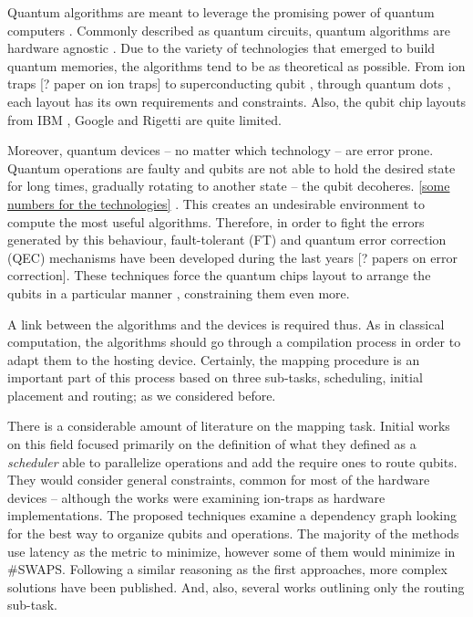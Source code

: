 \documentclass[11pt]{article}
\author{Daniel Moreno Manzano}
\date{\today}
\title{}
\begin{document}
Quantum algorithms are meant to leverage the promising power of quantum computers \cite{coles18:quant_algor_implem_begin}.
Commonly described as quantum circuits, quantum algorithms are hardware agnostic \cite{Nielsen_2009}.
Due to the variety of technologies that emerged to build quantum memories, the algorithms tend to be as theoretical as possible.
From ion traps [? paper on ion traps] to superconducting qubit \cite{Barends_2014}, through quantum dots \cite{Hill_2015,Li_2018}, each layout has its own requirements and constraints.
Also, the qubit chip layouts from IBM \cite{IBM_QX}, Google \cite{boixo16:charac_quant_suprem_near_term_devic} and Rigetti \cite{Sete_2016} are quite limited.

Moreover, quantum devices -- no matter which technology -- are error prone.
Quantum operations are faulty and qubits are not able to hold the desired state for long times, gradually rotating to another state -- the qubit decoheres.
\uline{[some numbers for the technologies]} \cite{O_Brien_2017}.
This creates an undesirable environment to compute the most useful algorithms.
Therefore, in order to fight the errors generated by this behaviour, fault-tolerant (FT) and quantum error correction (QEC) mechanisms have been developed during the last years \cite{Nielsen_2009} [? papers on error correction].
These techniques force the quantum chips layout to arrange the qubits in a particular manner \cite{Versluis_2017}, constraining them even more.

A link between the algorithms and the devices is required \cite{Fu_2016} thus.
As in classical computation, the algorithms should go through a compilation process in order to adapt them to the hosting device.
Certainly, the mapping procedure is an important part of this process based on three sub-tasks, scheduling, initial placement and routing; as we considered before.

There is a considerable amount of literature on the mapping task.
Initial works on this field \cite{Metodi_2006,Whitney_2007,Bahreini_2015} focused primarily on the definition of what they defined as a \emph{scheduler} able to parallelize operations and add the require ones to route qubits.
They would consider general constraints, common for most of the hardware devices -- although the works were examining ion-traps as hardware implementations.
The proposed techniques examine a dependency graph looking for the best way to organize qubits and operations.
The majority of the methods use latency as the metric to minimize, however some of them \cite{Farghadan_2017} would minimize in \#SWAPS.
Following a similar reasoning as the first approaches, more complex solutions \cite{booth18:compar_integ_const_progr_tempor} have been published.
And, also, several works \cite{Lye_2015,Wille_2016} outlining only the routing sub-task. 



\end{document}
